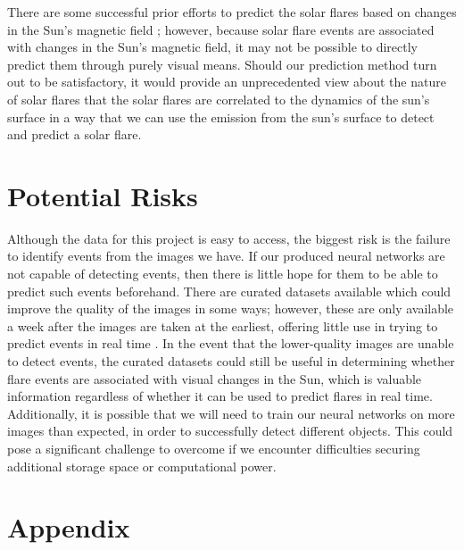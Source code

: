 \documentclass[12pt, letterpaper]{article}
\begin{document}
There are some successful prior efforts to predict the solar flares based on changes in the Sun’s magnetic field \cite{Raboonik2016}; however, because solar flare events are associated with changes in the Sun’s magnetic field, it may not be possible to directly predict them through purely visual means. Should our prediction method turn out to be satisfactory, it would provide an unprecedented view about the nature of solar flares that the solar flares are correlated to the dynamics of the sun's surface in a way that we can use the emission from the sun's surface to detect and predict a solar flare.


\section*{Potential Risks}

Although the data for this project is easy to access, the biggest risk is the failure to identify events from the images we have. If our produced neural networks are not capable of detecting events, then there is little hope for them to be able to predict such events beforehand. There are curated datasets available which could improve the quality of the images in some ways; however, these are only available a week after the images are taken at the earliest, offering little use in trying to predict events in real time \cite{Galvez2019}. In the event that the lower-quality images are unable to detect events, the curated datasets could still be useful in determining whether flare events are associated with visual changes in the Sun, which is valuable information regardless of whether it can be used to predict flares in real time. Additionally, it is possible that we will need to train our neural networks on more images than expected, in order to successfully detect different objects. This could pose a significant challenge to overcome if we encounter difficulties securing additional storage space or computational power. 




\pagebreak
\section*{Appendix}
\end{document}
